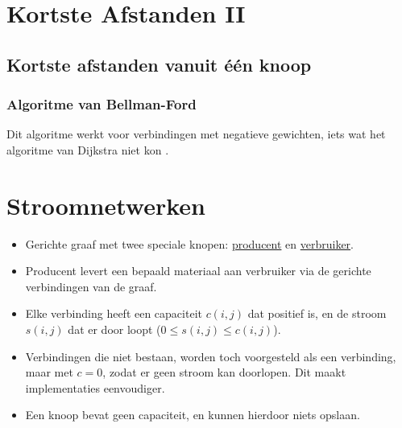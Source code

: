 \documentclass{report}
\begin{document}
\chapter{Kortste Afstanden II}
\section{Kortste afstanden vanuit één knoop}
\subsection{Algoritme van Bellman-Ford}
Dit algoritme werkt voor verbindingen met negatieve gewichten, iets wat het algoritme van Dijkstra niet kon .
\chapter{Stroomnetwerken}
\begin{itemize}
	\item Gerichte graaf met twee speciale knopen: \underline{producent} en \underline{verbruiker}.
	\item Producent levert een bepaald materiaal aan verbruiker via de gerichte verbindingen van de graaf.
	\item Elke verbinding heeft een capaciteit $c(i, j)$ dat positief is, en de stroom $s(i, j)$ dat er door loopt ($0 \leq s(i, j) \leq c(i, j)$). 
	\item Verbindingen die niet bestaan, worden toch voorgesteld als een verbinding, maar met $c = 0$, zodat er geen stroom kan doorlopen. Dit maakt implementaties eenvoudiger.
	\item Een knoop bevat geen capaciteit, en kunnen hierdoor niets opslaan.
\end{itemize}
\end{document}
